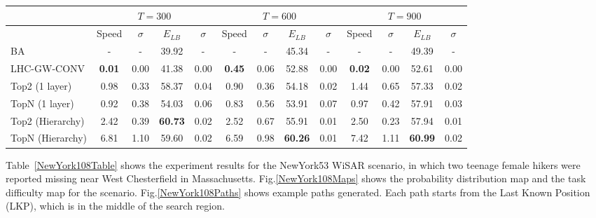 \begin{center}
\begin{table*}
{
\scriptsize
\hfill{}
\setlength{\extrarowheight}{1.5pt}
\begin{tabular}
{|l|c|c|c|c|c|c|c|c|c|c|c|c|}
\hline
& \multicolumn{4}{|c|}{$T=300$} & \multicolumn{4}{|c|}{$T=600$} & \multicolumn{4}{|c|}{$T=900$} \\ 
\hline
& Speed & $\sigma$ & $\mathit{E_{LB}}$ & $\sigma$ & Speed & $\sigma$ & $\mathit{E_{LB}}$ & $\sigma$ & Speed & $\sigma$ & $\mathit{E_{LB}}$ & $\sigma$\\ 
\hline
BA & - & - & 39.92 & - & - & - & 45.34 & - & - & - & 49.39 & -\\ 
\hline
LHC-GW-CONV & \textbf{0.01} & 0.00 & 41.38 & 0.00 & \textbf{0.45} & 0.06 & 52.88 & 0.00 & \textbf{0.02} & 0.00 & 52.61 & 0.00\\ 
\hline
Top2 (1 layer) & 0.98 & 0.33 & 58.37 & 0.04 & 0.90 & 0.36 & 54.18 & 0.02 & 1.44 & 0.65 & 57.33 & 0.02\\ 
\hline
TopN (1 layer) & 0.92 & 0.38 & 54.03 & 0.06 & 0.83 & 0.56 & 53.91 & 0.07 & 0.97 & 0.42 & 57.91 & 0.03\\ 
\hline
Top2 (Hierarchy) & 2.42 & 0.39 & \textbf{60.73} & 0.02 & 2.52 & 0.67 & 55.91 & 0.01 & 2.50 & 0.23 & 57.94 & 0.01\\ 
\hline
TopN (Hierarchy) & 6.81 & 1.10 & 59.60 & 0.02 & 6.59 & 0.98 & \textbf{60.26} & 0.01 & 7.42 & 1.11 & \textbf{60.99} & 0.02\\ 
\hline
\end{tabular}}
\medskip
\caption{Algorithms speed and $\mathit{Efficiency_{LB}}$ comparison for the NewYork108 scenario.}
\label{NewYork108Table}
\end{table*}
\end{center}
Table~\ref{NewYork108Table} shows the experiment results for the NewYork53 WiSAR scenario, in which two teenage female hikers were reported missing near West Chesterfield in Massachusetts. Fig.\ref{NewYork108Maps} shows the probability distribution map and the task difficulty map for the scenario. Fig.\ref{NewYork108Paths} shows example paths generated. Each path starts from the Last Known Position (LKP), which is in the middle of the search region.


